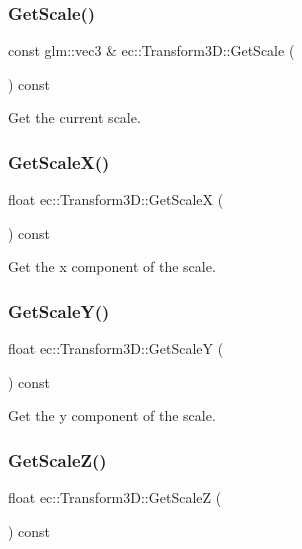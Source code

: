 \subsubsection{\texorpdfstring{Get\+Scale()}{GetScale()}}
{\footnotesize\ttfamily const glm\+::vec3 \& ec\+::\+Transform3\+D\+::\+Get\+Scale (\begin{DoxyParamCaption}{ }\end{DoxyParamCaption}) const}

Get the current scale. \mbox{\label{classec_1_1_transform3_d_a34c610a94a2802100447d053a7866b85}} 
\subsubsection{\texorpdfstring{Get\+Scale\+X()}{GetScaleX()}}
{\footnotesize\ttfamily float ec\+::\+Transform3\+D\+::\+Get\+ScaleX (\begin{DoxyParamCaption}{ }\end{DoxyParamCaption}) const}

Get the x component of the scale. \mbox{\label{classec_1_1_transform3_d_abfa421cde566209e669eba461cdafb16}} 
\subsubsection{\texorpdfstring{Get\+Scale\+Y()}{GetScaleY()}}
{\footnotesize\ttfamily float ec\+::\+Transform3\+D\+::\+Get\+ScaleY (\begin{DoxyParamCaption}{ }\end{DoxyParamCaption}) const}

Get the y component of the scale. \mbox{\label{classec_1_1_transform3_d_ae4c302baa33386b27eecb1cd4c627573}} 
\subsubsection{\texorpdfstring{Get\+Scale\+Z()}{GetScaleZ()}}
{\footnotesize\ttfamily float ec\+::\+Transform3\+D\+::\+Get\+ScaleZ (\begin{DoxyParamCaption}{ }\end{DoxyParamCaption}) const}

